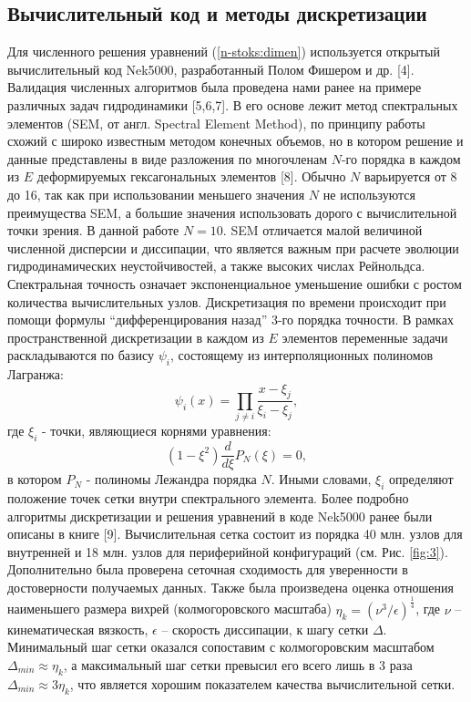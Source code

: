 \subsection{Вычислительный код и методы дискретизации}
%
Для численного решения уравнений (\ref{n-stoks:dimen}) используется открытый вычислительный код Nek5000, разработанный Полом Фишером и др. [4].
%
Валидация численных алгоритмов была проведена нами ранее на примере различных задач гидродинамики [5,6,7].
%
В его основе лежит метод спектральных элементов (SEM, от англ. Spectral Element Method), по принципу работы схожий с широко известным методом конечных объемов, но в котором решение и данные представлены в виде разложения по многочленам $N$-го порядка в каждом из $E$ деформируемых гексагональных элементов [8].
%
Обычно $N$ варьируется от 8 до 16, так как при использовании меньшего значения $N$ не используются преимущества SEM, а большие значения использовать дорого с вычислительной точки зрения. 
%
В данной работе  $N=10$.
%
SEM отличается малой величиной численной дисперсии и диссипации, что является важным при расчете эволюции гидродинамических неустойчивостей, а также высоких числах Рейнольдса.
%
Спектральная точность означает экспоненциальное уменьшение ошибки с ростом количества вычислительных узлов.
%
Дискретизация по времени происходит при помощи формулы ``дифференцирования назад'' 3-го порядка точности.
%
В рамках пространственной дискретизации в каждом из $E$ элементов переменные задачи раскладываются по базису ${\psi_i}$, состоящему из интерполяционных полиномов Лагранжа:
%
\[
\psi_i(x)=\prod_{j \neq i}\frac{x-\xi_j}{\xi_i-\xi_j}, 
\]
%
где $\xi_i$ - точки, являющиеся корнями уравнения:
\[
(1-\xi^2)\frac{d}{d\xi}P_N(\xi)=0,
\]
в котором $P_N$ - полиномы Лежандра порядка $N$. 
%
Иными словами, $\xi_i$ определяют положение точек сетки внутри спектрального элемента.
%
Более подробно алгоритмы дискретизации и решения уравнений в коде Nek5000 ранее были описаны в книге [9].
%
Вычислительная сетка состоит из порядка 40 млн. узлов для внутренней и 18 млн. узлов для периферийной конфигураций (см. Рис. \ref{fig:3}).
%
Дополнительно была проверена сеточная сходимость для уверенности в достоверности получаемых данных.
%
Также была произведена оценка отношения наименьшего размера вихрей (колмогоровского масштаба)  $\eta_k = (\nu^3/\epsilon)^\frac{1}{4}$, где $\nu$ -- кинематическая вязкость, $\epsilon$ -- скорость диссипации, к шагу сетки $\Delta$.
%
Минимальный шаг сетки оказался сопоставим с колмогоровским масштабом $\Delta_{min} \approx \eta_k$, а максимальный шаг сетки превысил его всего лишь в 3 раза $\Delta_{min} \approx 3\eta_k$, что является хорошим показателем качества вычислительной сетки.

